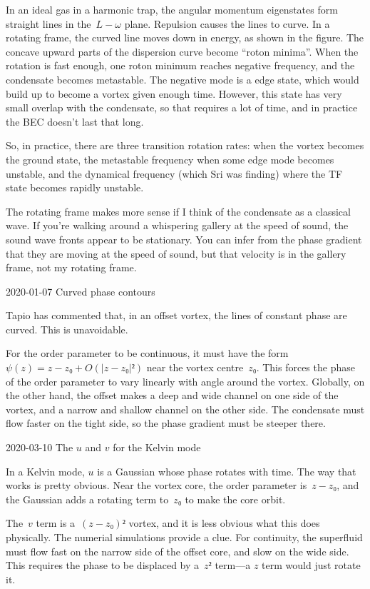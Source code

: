 In an ideal gas in a harmonic trap, the angular momentum eigenstates form straight lines in the~$L-ω$ plane.  Repulsion causes the lines to curve.  In a rotating frame, the curved line moves down in energy, as shown in the figure.  The concave upward parts of the dispersion curve become “roton minima”.  When the rotation is fast enough, one roton minimum reaches negative frequency, and the condensate becomes metastable.  The negative mode is a edge state, which would build up to become a vortex given enough time.  However, this state has very small overlap with the condensate, so that requires a lot of time, and in practice the BEC doesn't last that long.

So, in practice, there are three transition rotation rates: when the vortex becomes the ground state, the metastable frequency when some edge mode becomes unstable, and the dynamical frequency (which Sri was finding) where the TF state becomes rapidly unstable.

The rotating frame makes more sense if I think of the condensate as a classical wave.  If you're walking around a whispering gallery at the speed of sound, the sound wave fronts appear to be stationary.  You can infer from the phase gradient that they are moving at the speed of sound, but that velocity is in the gallery frame, not my rotating frame.

2020-01-07 Curved phase contours

Tapio has commented that, in an offset vortex, the lines of constant
phase are curved.  This is unavoidable.

For the order parameter to be continuous, it must have the
form~$ψ(z)=z-z₀+O(|z-z₀|²)$ near the vortex centre~$z₀$.  This
forces the phase of the order parameter to vary linearly with angle
around the vortex.  Globally, on the other hand, the offset makes
a deep and wide channel on one side of the vortex, and a narrow and
shallow channel on the other side.  The condensate must flow faster
on the tight side, so the phase gradient must be steeper there.

2020-03-10 The $u$ and $v$ for the Kelvin mode

In a Kelvin mode, $u$ is a Gaussian whose phase rotates with time.
The way that works is pretty obvious.  Near the vortex core, the
order parameter is~$z-z₀$, and the Gaussian adds a rotating term
to~$z₀$ to make the core orbit.

The~$v$ term is a~$(z-z₀)²$ vortex, and it is less obvious what
this does physically.  The numerial simulations provide a clue.
For continuity, the superfluid must flow fast on the narrow side
of the offset core, and slow on the wide side.  This requires the
phase to be displaced by a~$z²$ term—a $z$ term would just rotate
it.

